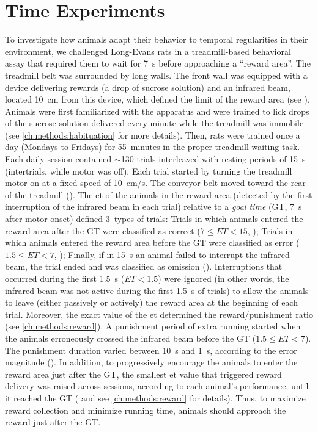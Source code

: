\chapter{Time Experiments} \label{ch:time}

To investigate how animals adapt their behavior to temporal regularities in their environment, we challenged Long-Evans rats in a treadmill-based behavioral assay that required them to wait for 7~s before approaching a ``reward area''.\footnotemark
{}
The treadmill belt was surrounded by long walls.
The front wall was equipped with a device delivering rewards (a drop of sucrose solution) and an infrared beam, located 10~cm from this device, which defined the limit of the reward area (see ).
Animals were first familiarized with the apparatus and were trained to lick drops of the sucrose solution delivered every minute while the treadmill was immobile (see \autoref{ch:methods:habituation} for more details).
Then, rats were trained once a day (Mondays to Fridays) for 55~minutes in the proper treadmill waiting task.
Each daily session contained $\sim$130 trials interleaved with resting periods of 15~s (intertrials, while motor was off).
Each trial started by turning the treadmill motor on at a fixed speed of 10~cm/s.
The conveyor belt moved toward the rear of the treadmill ().
The \gls{et} of the animals in the reward area (detected by the first interruption of the infrared beam in each trial) relative to a \emph{goal time} (GT, 7~s after motor onset) defined 3~types of trials:
    Trials in which animals entered the reward area after the GT were classified as correct ($7\leq ET<15$, );
    Trials in which animals entered the reward area before the GT were classified as error ($1.5\leq ET<7$, );
    Finally, if in 15~s an animal failed to interrupt the infrared beam, the trial ended and was classified as omission ().
Interruptions that occurred during the first 1.5~s ($ET<1.5$) were ignored (in other words, the infrared beam was not active during the first 1.5~s of trials) to allow the animals to leave (either passively or actively) the reward area at the beginning of each trial.
Moreover, the exact value of the \gls{et} determined the reward/punishment ratio (see \autoref{ch:methods:reward}).
A punishment period of extra running started when the animals erroneously crossed the infrared beam before the GT ($1.5\leq ET<7$).
The punishment duration varied between 10~s and 1~s, according to the error magnitude ().
In addition, to progressively encourage the animals to enter the reward area just after the GT, the smallest \gls{et} value that triggered reward delivery was raised across sessions, according to each animal's performance, until it reached the GT ( and see \autoref{ch:methods:reward} for details).
Thus, to maximize reward collection and minimize running time, animals should approach the reward just after the GT.

